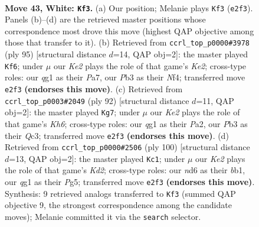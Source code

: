\documentclass[11pt]{article}
\begin{document}
\clearpage

\begin{figure}[p]\centering
\begin{subfigure}{0.46\textwidth}\centering
\resizebox{\linewidth}{!}{%
\newchessgame
\chessboard[
  setfen={4k3/8/3n4/6b1/1p6/1P6/4K3/6q1 w - - 6 43},
  showmover=false,
  pgfstyle=straightmove, color=movearrow, markmove={e2-f3}
]}
\caption{}
\end{subfigure}\hfill
\begin{subfigure}{0.46\textwidth}\centering
\resizebox{\linewidth}{!}{%
\newchessgame
\chessboard[
  setfen={8/p3k3/8/5N2/5n1K/P7/8/8 b - - 1 48},
  showmover=false,
  pgfstyle=straightmove, color=movearrow, markmove={e7-f6}
]}
\caption{}
\end{subfigure}
\\[4pt]
\begin{subfigure}{0.46\textwidth}\centering
\resizebox{\linewidth}{!}{%
\newchessgame
\chessboard[
  setfen={k2q4/8/p6K/8/8/2Q5/P7/8 w - - 3 47},
  showmover=false,
  pgfstyle=straightmove, color=movearrow, markmove={h6-g7}
]}
\caption{}
\end{subfigure}\hfill
\begin{subfigure}{0.46\textwidth}\centering
\resizebox{\linewidth}{!}{%
\newchessgame
\chessboard[
  setfen={8/8/8/6P1/p3k3/P7/3K4/1b6 w - - 6 51},
  showmover=false,
  pgfstyle=straightmove, color=movearrow, markmove={d2-c1}
]}
\caption{}
\end{subfigure}
\caption{\textbf{Move 43, White: \texttt{Kf3}.} (a) Our position; Melanie plays \texttt{Kf3} (\texttt{e2f3}). Panels (b)--(d) are the retrieved master positions whose correspondence most drove this move (highest QAP objective among those that transfer to it). (b) Retrieved from \texttt{ccrl\_top\_p0000\#3978} (ply 95) [structural distance $d$=14, QAP obj=2]: the master played \texttt{Kf6}; under $\mu$ our \emph{Ke2} plays the role of that game's \emph{Ke2}; cross-type roles: our \emph{q}g1 as their \emph{P}a7, our \emph{P}b3 as their \emph{N}f4; transferred move \texttt{e2f3} \textbf{(endorses this move)}. (c) Retrieved from \texttt{ccrl\_top\_p0003\#2049} (ply 92) [structural distance $d$=11, QAP obj=2]: the master played \texttt{Kg7}; under $\mu$ our \emph{Ke2} plays the role of that game's \emph{Kh6}; cross-type roles: our \emph{q}g1 as their \emph{P}a2, our \emph{P}b3 as their \emph{Q}c3; transferred move \texttt{e2f3} \textbf{(endorses this move)}. (d) Retrieved from \texttt{ccrl\_top\_p0000\#2506} (ply 100) [structural distance $d$=13, QAP obj=2]: the master played \texttt{Kc1}; under $\mu$ our \emph{Ke2} plays the role of that game's \emph{Kd2}; cross-type roles: our \emph{n}d6 as their \emph{b}b1, our \emph{q}g1 as their \emph{P}g5; transferred move \texttt{e2f3} \textbf{(endorses this move)}. Synthesis: 9 retrieved analogs transferred to \texttt{Kf3} (summed QAP objective 9, the strongest correspondence among the candidate moves); Melanie committed it via the \texttt{search} selector.}
\label{fig:thought-m84}
\end{figure}
\end{document}
